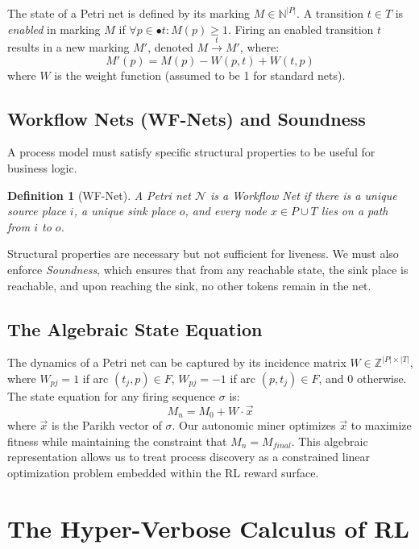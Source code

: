 \documentclass[12pt,a4paper]{report}
\newtheorem{definition}{Definition}[chapter]
\begin{document}
The state of a Petri net is defined by its marking $M \in \mathbb{N}^{|P|}$. A transition $t \in T$ is \textit{enabled} in marking $M$ if $\forall p \in \bullet t: M(p) \geq 1$. Firing an enabled transition $t$ results in a new marking $M'$, denoted $M \xrightarrow{t} M'$, where:
\begin{equation}
M'(p) = M(p) - W(p, t) + W(t, p)
\end{equation}
where $W$ is the weight function (assumed to be 1 for standard nets).

\section{Workflow Nets (WF-Nets) and Soundness}
A process model must satisfy specific structural properties to be useful for business logic. 
\begin{definition}[WF-Net]
A Petri net $\mathcal{N}$ is a Workflow Net if there is a unique source place $i$, a unique sink place $o$, and every node $x \in P \cup T$ lies on a path from $i$ to $o$.
\end{definition}

Structural properties are necessary but not sufficient for liveness. We must also enforce \textit{Soundness}, which ensures that from any reachable state, the sink place is reachable, and upon reaching the sink, no other tokens remain in the net.

\section{The Algebraic State Equation}
The dynamics of a Petri net can be captured by its incidence matrix $W \in \mathbb{Z}^{|P| \times |T|}$, where $W_{pj} = 1$ if arc $(t_j, p) \in F$, $W_{pj} = -1$ if arc $(p, t_j) \in F$, and $0$ otherwise. The state equation for any firing sequence $\sigma$ is:
\begin{equation}
M_n = M_0 + W \cdot \vec{x}
\end{equation}
where $\vec{x}$ is the Parikh vector of $\sigma$. Our autonomic miner optimizes $\vec{x}$ to maximize fitness while maintaining the constraint that $M_n = M_{final}$. This algebraic representation allows us to treat process discovery as a constrained linear optimization problem embedded within the RL reward surface.

\chapter{The Hyper-Verbose Calculus of RL}
\end{document}
